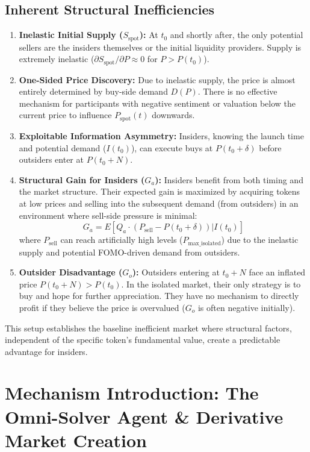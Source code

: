 \documentclass{article}
\begin{document}
\subsection{Inherent Structural Inefficiencies}
\begin{enumerate}
    \item \textbf{Inelastic Initial Supply ($S_{\text{spot}}$):} At $t_0$ and shortly after, the only potential sellers are the insiders themselves or the initial liquidity providers. Supply is extremely inelastic ($\partial S_{\text{spot}}/\partial P \approx 0$ for $P > P(t_0)$).
    \item \textbf{One-Sided Price Discovery:} Due to inelastic supply, the price is almost entirely determined by buy-side demand $D(P)$. There is no effective mechanism for participants with negative sentiment or valuation below the current price to influence $P_{\text{spot}}(t)$ downwards.
    \item \textbf{Exploitable Information Asymmetry:} Insiders, knowing the launch time and potential demand ($I(t_0)$), can execute buys at $P(t_0+\delta)$ before outsiders enter at $P(t_0+N)$.
    \item \textbf{Structural Gain for Insiders ($G_a$):} Insiders benefit from both timing and the market structure. Their expected gain is maximized by acquiring tokens at low prices and selling into the subsequent demand (from outsiders) in an environment where sell-side pressure is minimal:
    \[
    G_a = E[Q_a \cdot (P_{\text{sell}} - P(t_0+\delta)) | I(t_0)]
    \]
    where $P_{\text{sell}}$ can reach artificially high levels ($P_{\text{max\_isolated}}$) due to the inelastic supply and potential FOMO-driven demand from outsiders.
    \item \textbf{Outsider Disadvantage ($G_o$):} Outsiders entering at $t_0+N$ face an inflated price $P(t_0+N) > P(t_0)$. In the isolated market, their only strategy is to buy and hope for further appreciation. They have no mechanism to directly profit if they believe the price is overvalued ($G_o$ is often negative initially).
\end{enumerate}
This setup establishes the baseline inefficient market where structural factors, independent of the specific token's fundamental value, create a predictable advantage for insiders.

\section{Mechanism Introduction: The Omni-Solver Agent & Derivative Market Creation}
\end{document}

